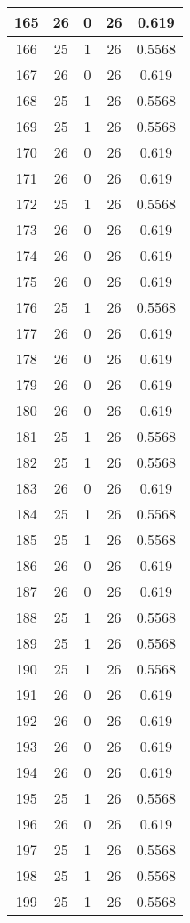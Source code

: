 \documentclass[letterpaper, 12pt]{article}
\begin{document}
\begin{longtable}{|c|c|c|c|c|}
\hline
165 & 26 & 0 & 26 & 0.619 \\
\hline
166 & 25 & 1 & 26 & 0.5568 \\
\hline
167 & 26 & 0 & 26 & 0.619 \\
\hline
168 & 25 & 1 & 26 & 0.5568 \\
\hline
169 & 25 & 1 & 26 & 0.5568 \\
\hline
170 & 26 & 0 & 26 & 0.619 \\
\hline
171 & 26 & 0 & 26 & 0.619 \\
\hline
172 & 25 & 1 & 26 & 0.5568 \\
\hline
173 & 26 & 0 & 26 & 0.619 \\
\hline
174 & 26 & 0 & 26 & 0.619 \\
\hline
175 & 26 & 0 & 26 & 0.619 \\
\hline
176 & 25 & 1 & 26 & 0.5568 \\
\hline
177 & 26 & 0 & 26 & 0.619 \\
\hline
178 & 26 & 0 & 26 & 0.619 \\
\hline
179 & 26 & 0 & 26 & 0.619 \\
\hline
180 & 26 & 0 & 26 & 0.619 \\
\hline
181 & 25 & 1 & 26 & 0.5568 \\
\hline
182 & 25 & 1 & 26 & 0.5568 \\
\hline
183 & 26 & 0 & 26 & 0.619 \\
\hline
184 & 25 & 1 & 26 & 0.5568 \\
\hline
185 & 25 & 1 & 26 & 0.5568 \\
\hline
186 & 26 & 0 & 26 & 0.619 \\
\hline
187 & 26 & 0 & 26 & 0.619 \\
\hline
188 & 25 & 1 & 26 & 0.5568 \\
\hline
189 & 25 & 1 & 26 & 0.5568 \\
\hline
190 & 25 & 1 & 26 & 0.5568 \\
\hline
191 & 26 & 0 & 26 & 0.619 \\
\hline
192 & 26 & 0 & 26 & 0.619 \\
\hline
193 & 26 & 0 & 26 & 0.619 \\
\hline
194 & 26 & 0 & 26 & 0.619 \\
\hline
195 & 25 & 1 & 26 & 0.5568 \\
\hline
196 & 26 & 0 & 26 & 0.619 \\
\hline
197 & 25 & 1 & 26 & 0.5568 \\
\hline
198 & 25 & 1 & 26 & 0.5568 \\
\hline
199 & 25 & 1 & 26 & 0.5568 \\
\hline
\end{longtable}
\end{document}
